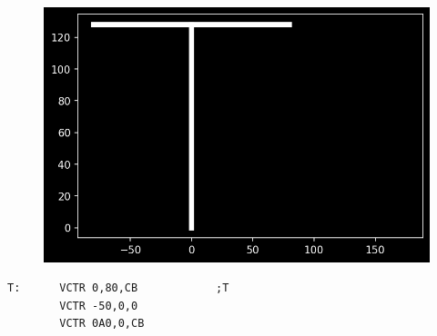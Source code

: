 \clearpage
\begin{minipage}[c]{0.48\linewidth}
\begin{figure}[H]
    \centering
    \begin{adjustbox}{width=4cm,center}
      \includegraphics[width=12cm]{src/titles/letters/T.png}%
    \end{adjustbox}
\end{figure}
\end{minipage}
\begin{minipage}[c]{0.48\linewidth}
\begin{lstlisting}[basicstyle=\scriptsize\ttfamily]
T:      VCTR 0,80,CB            ;T
        VCTR -50,0,0
        VCTR 0A0,0,CB
\end{lstlisting}
\vspace*{\fill}
\end{minipage}

